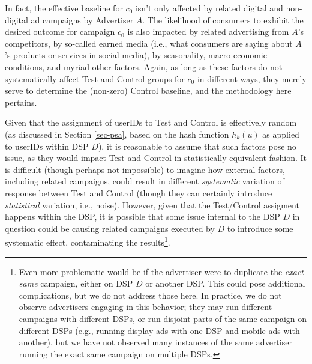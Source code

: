 \documentclass[11pt,a4paper]{article}
\theoremstyle{definition}
\theoremstyle{remark}
\theoremstyle{definition}
\theoremstyle{definition}
\theoremstyle{definition}
\theoremstyle{definition}
\theoremstyle{definition}
\theoremstyle{definition}
\begin{document}
In fact, the effective baseline for $c_0$ isn't only affected by related digital and non-digital ad campaigns by Advertiser $A$. The likelihood of consumers to exhibit the desired outcome for campaign $c_0$ is also impacted by  related advertising from $A$'s competitors, by so-called earned media (i.e., what consumers are saying about $A$'s products or services in social media), by seasonality, macro-economic conditions, and myriad other factors. Again, as long as these factors do not systematically affect Test and Control groups for $c_0$ in different ways, they merely serve to determine the (non-zero) Control baseline, and the methodology here pertains. 

Given that the assignment of userIDs to Test and Control is effectively random (as discussed in Section \ref{sec-psa}, based on the hash function $h_k(u)$ as applied to userIDs within DSP $D$), it is reasonable to assume that such factors pose no issue, as they would impact Test and Control in statistically equivalent fashion. It is difficult (though perhaps not impossible) to imagine how external factors, including related campaigns, could result in different \textit{systematic} variation of response between Test and Control (though they can certainly introduce \textit{statistical} variation, i.e., noise). However, given that the Test/Control assigment happens within the DSP, it is possible that some issue internal to the DSP $D$ in question could be causing related campaigns executed by $D$ to introduce some systematic effect, contaminating the results\footnote{Even more problematic would be if the advertiser were to duplicate the {\em exact same} campaign, either on DSP $D$ or another DSP. This could pose additional complications, but we do not address those here. In practice, we do not observe advertisers engaging in this behavior; they may run different campaigns with different DSPs, or run disjoint parts of the same campaign on different DSPs (e.g., running display ads with one DSP and mobile ads with another), but we have not observed many instances of the same advertiser running the exact same campaign on multiple DSPs.}.
\end{document}
